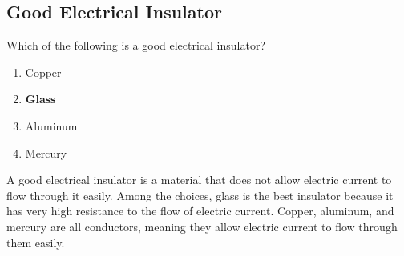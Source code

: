 \subsection{Good Electrical Insulator}
\label{T5A08}

\begin{tcolorbox}[colback=gray!10!white,colframe=black!75!black,title=T5A08]
Which of the following is a good electrical insulator?
\begin{enumerate}[noitemsep]
    \item Copper
    \item \textbf{Glass}
    \item Aluminum
    \item Mercury
\end{enumerate}
\end{tcolorbox}

A good electrical insulator is a material that does not allow electric current to flow through it easily. Among the choices, glass is the best insulator because it has very high resistance to the flow of electric current. Copper, aluminum, and mercury are all conductors, meaning they allow electric current to flow through them easily.